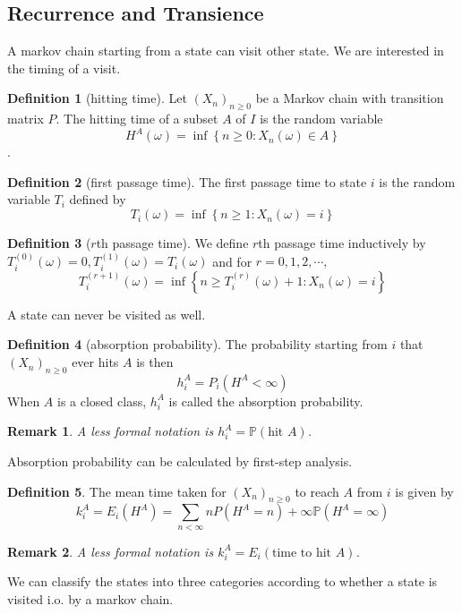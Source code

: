 \documentclass{article}
\newtheorem*{Rk}{Remark}
\theoremstyle{definition}
\newtheorem{Def}{Definition}[section]
\newcommand{\PP}{\mathbb{P}}
\renewcommand{\geq}{\geqslant}
\newcommand{\<}{\left\langle}
\renewcommand{\>}{\right\rangle}
\begin{document}
\subsection{Recurrence and Transience}
A markov chain starting from a state can visit other state. We are interested in the timing of a visit.

\begin{Def}[hitting time]
    Let $(X_n)_{n\geq 0}$ be a Markov chain with transition matrix $P$. The hitting time of a subset $A$ of $I$ is the random
    variable \[H^A(\omega)=\inf \left\{n\geq 0:X_n(\omega)\in A\right\}\].
\end{Def}
\begin{Def}[first passage time]
    The first passage time to state $i$ is the random variable $T_i$ defined by \[T_i(\omega)=\inf\left\{n\geq 1:X_n(\omega)=i\right\}\]
\end{Def}
\begin{Def}[$r$th passage time]
    We define $r$th passage time inductively by 
    $T_i^{(0)}(\omega)=0,T_i^{(1)}(\omega)=T_i(\omega)$
    and for $r=0,1,2,\cdots,$
    \[T_i^{(r+1)}(\omega)=\inf\left\{n\geq T_i^{(r)}(\omega)+1:X_n(\omega)=i\right\}\]
\end{Def}

A state can never be visited as well.

\begin{Def}[absorption probability]
    The probability starting from $i$ that $(X_n)_{n\geq 0}$ ever hits $A$ is then \[h_i^A=P_i(H^A<\infty)\]
    When $A$ is a closed class, $h_i^A$ is called the absorption probability.
\end{Def}
\begin{Rk}
A less formal notation is $h_i^A=\PP(\text{hit }A)$.
\end{Rk}
Absorption probability can be calculated by first-step analysis.
\begin{Def}
    The mean time taken for $(X_n)_{n\geq 0}$ to reach $A$ from $i$ is given by \[k_i^A=E_i(H^A)=\sum_{n<\infty}nP(H^A=n)+\infty \PP(H^A=\infty)\]
\end{Def}
\begin{Rk}
    A less formal notation is $k_i^A=E_i(\text{time to hit }A)$.
\end{Rk}

We can classify the states into three categories according to whether a state is visited i.o. by a markov chain.
\end{document}
